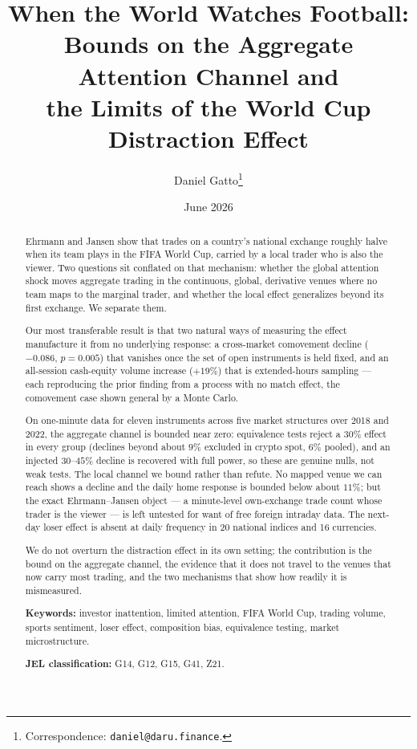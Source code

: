 \documentclass[12pt]{article}
\title{\bf When the World Watches Football:\\[2pt] Bounds on the Aggregate Attention Channel and\\ the Limits of the World Cup Distraction Effect}
\author[1]{Daniel Gatto\thanks{Correspondence: \texttt{daniel@daru.finance}.}}
\affil[1]{Universidade Paulista (UNIP)}
\date{June 2026}
\begin{document}
\maketitle
\begin{abstract}
\noindent Ehrmann and Jansen show that trades on a country's national exchange roughly halve when its team plays in the FIFA World Cup, carried by a local trader who is also the viewer. Two questions sit conflated on that mechanism: whether the global attention shock moves aggregate trading in the continuous, global, derivative venues where no team maps to the marginal trader, and whether the local effect generalizes beyond its first exchange. We separate them.

\smallskip\noindent Our most transferable result is that two natural ways of measuring the effect manufacture it from no underlying response: a cross-market comovement decline ($-0.086$, $p=0.005$) that vanishes once the set of open instruments is held fixed, and an all-session cash-equity volume increase ($+19\%$) that is extended-hours sampling --- each reproducing the prior finding from a process with no match effect, the comovement case shown general by a Monte Carlo.

\smallskip\noindent On one-minute data for eleven instruments across five market structures over 2018 and 2022, the aggregate channel is bounded near zero: equivalence tests reject a $30\%$ effect in every group (declines beyond about $9\%$ excluded in crypto spot, $6\%$ pooled), and an injected $30$--$45\%$ decline is recovered with full power, so these are genuine nulls, not weak tests. The local channel we bound rather than refute. No mapped venue we can reach shows a decline and the daily home response is bounded below about $11\%$; but the exact Ehrmann--Jansen object --- a minute-level own-exchange trade count whose trader is the viewer --- is left untested for want of free foreign intraday data. The next-day loser effect is absent at daily frequency in 20 national indices and 16 currencies.

\smallskip\noindent We do not overturn the distraction effect in its own setting; the contribution is the bound on the aggregate channel, the evidence that it does not travel to the venues that now carry most trading, and the two mechanisms that show how readily it is mismeasured.

\smallskip\noindent\textbf{Keywords:} investor inattention, limited attention, FIFA World Cup, trading volume, sports sentiment, loser effect, composition bias, equivalence testing, market microstructure.

\smallskip\noindent\textbf{JEL classification:} G14, G12, G15, G41, Z21.
\end{abstract}
\end{document}
